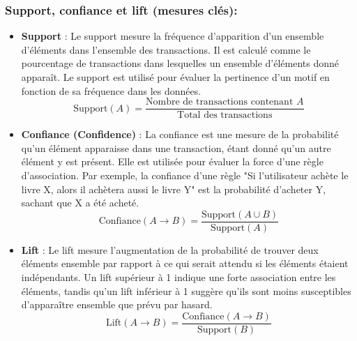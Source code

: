 \documentclass[a4paper, 12pt]{article}
\begin{document}
\subsubsection {Support, confiance et lift (mesures clés):}
\begin{itemize}
    \item \textbf{Support} : Le support mesure la fréquence d'apparition d'un ensemble d'éléments dans l'ensemble des transactions. Il est calculé comme le pourcentage de transactions dans lesquelles un ensemble d'éléments donné apparaît. Le support est utilisé pour évaluer la pertinence d'un motif en fonction de sa fréquence dans les données.
    \[
    \text{Support}(A) = \frac{\text{Nombre de transactions contenant } A}{\text{Total des transactions}}
    \]
    \item \textbf{Confiance (Confidence)} : La confiance est une mesure de la probabilité qu'un élément apparaisse dans une transaction, étant donné qu'un autre élément y est présent. Elle est utilisée pour évaluer la force d'une règle d'association. Par exemple, la confiance d'une règle "Si l'utilisateur achète le livre X, alors il achètera aussi le livre Y" est la probabilité d'acheter Y, sachant que X a été acheté.
    \[
    \text{Confiance}(A \rightarrow B) = \frac{\text{Support}(A \cup B)}{\text{Support}(A)}
    \]
    \item \textbf{Lift} : Le lift mesure l'augmentation de la probabilité de trouver deux éléments ensemble par rapport à ce qui serait attendu si les éléments étaient indépendants. Un lift supérieur à 1 indique une forte association entre les éléments, tandis qu'un lift inférieur à 1 suggère qu'ils sont moins susceptibles d'apparaître ensemble que prévu par hasard.
    \[
    \text{Lift}(A \rightarrow B) = \frac{\text{Confiance}(A \rightarrow B)}{\text{Support}(B)}
    \]
\end{itemize}
\end{document}
